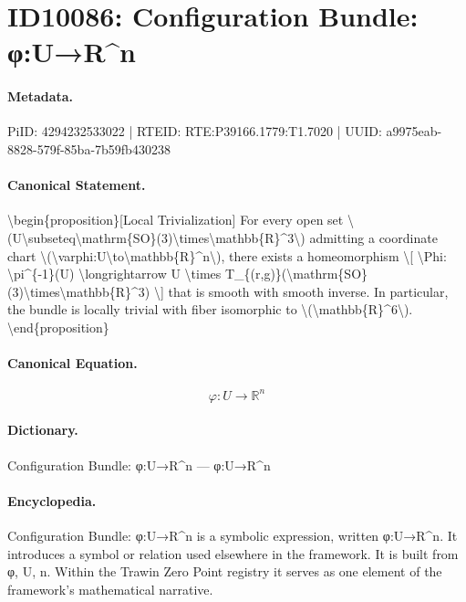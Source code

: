 \section*{ID10086: Configuration Bundle: φ:U→R\textasciicircum{}n}
\paragraph{Metadata.}
PiID: 4294232533022 | RTEID: RTE:P39166.1779:T1.7020 | UUID: a9975eab-8828-579f-85ba-7b59fb430238

\paragraph{Canonical Statement.}
\textbackslash{}begin\{proposition\}[Local Trivialization] For every open set \textbackslash{}(U\textbackslash{}subseteq\textbackslash{}mathrm\{SO\}(3)\textbackslash{}times\textbackslash{}mathbb\{R\}\textasciicircum{}3\textbackslash{}) admitting a coordinate chart \textbackslash{}(\textbackslash{}varphi:U\textbackslash{}to\textbackslash{}mathbb\{R\}\textasciicircum{}n\textbackslash{}), there exists a homeomorphism \textbackslash{}[ \textbackslash{}Phi: \textbackslash{}pi\textasciicircum{}\{-1\}(U) \textbackslash{}longrightarrow U \textbackslash{}times T\_\{(r,g)\}(\textbackslash{}mathrm\{SO\}(3)\textbackslash{}times\textbackslash{}mathbb\{R\}\textasciicircum{}3) \textbackslash{}] that is smooth with smooth inverse. In particular, the bundle is locally trivial with fiber isomorphic to \textbackslash{}(\textbackslash{}mathbb\{R\}\textasciicircum{}6\textbackslash{}). \textbackslash{}end\{proposition\}

\paragraph{Canonical Equation.}
\[
\varphi:U\to\mathbb{R}^n
\]

\paragraph{Dictionary.}
Configuration Bundle: φ:U→R\textasciicircum{}n — φ:U→R\textasciicircum{}n

\paragraph{Encyclopedia.}
Configuration Bundle: φ:U→R\textasciicircum{}n is a symbolic expression, written φ:U→R\textasciicircum{}n. It introduces a symbol or relation used elsewhere in the framework. It is built from φ, U, n. Within the Trawin Zero Point registry it serves as one element of the framework's mathematical narrative.
